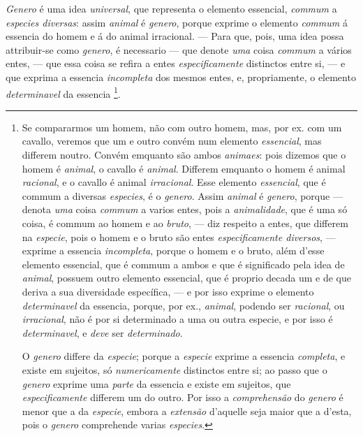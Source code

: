 \emph{Genero} é uma idea \emph{universal}, que representa o elemento essencial, \emph{commum} a \emph{especies diversas}: assim \emph{animal} é \emph{genero}, porque exprime o elemento \emph{commum} á essencia do homem e á do animal irracional. --- Para que, pois, uma idea possa attribuir-se como \emph{genero}, é necessario --- que denote \emph{uma} coisa \emph{commum} a vários entes, --- que essa coisa se refira a entes \emph{especificamente} distinctos entre si, --- e que exprima a essencia \emph{incompleta} dos mesmos entes, e, propriamente, o elemento \emph{determinavel} da essencia \footnote{Se compararmos um homem, não com outro homem, mas, por ex. com um cavallo, veremos que um e outro convém num elemento \emph{essencial}, mas differem noutro. Convém emquanto são ambos \emph{animaes}: pois dizemos que o homem é \emph{animal}, o cavallo é \emph{animal}. Differem emquanto o homem é animal \emph{racional}, e o cavallo é animal \emph{irracional}. Esse elemento \emph{essencial}, que é commum a diversas \emph{especies}, é o \emph{genero}. Assim \emph{animal} é \emph{genero}, porque --- denota \emph{uma} coisa \emph{commum} a varios entes, pois a \emph{animalidade}, que é uma só coisa, é commum ao homem e ao \emph{bruto}, --- diz respeito a entes, que differem na \emph{especie}, pois o homem e o bruto são entes \emph{especificamente diversos}, --- exprime a essencia \emph{incompleta}, porque o homem e o bruto, além d'esse elemento essencial, que é commum a ambos e que é significado pela idea de \emph{animal}, possuem outro elemento essencial, que é proprio decada um e de que deriva a sua diversidade específica, --- e por isso exprime o elemento \emph{determinavel} da essencia, porque, por ex., \emph{animal}, podendo ser \emph{racional}, ou \emph{irracional}, não é por si determinado a uma ou outra especie, e por isso é \emph{determinavel}, e \emph{deve} ser \emph{determinado}.\par O \emph{genero} differe da \emph{especie}; porque a \emph{especie} exprime a essencia \emph{completa}, e existe em sujeitos, só \emph{numericamente} distinctos entre si; ao passo que o \emph{genero} exprime uma \emph{parte} da essencia e existe em sujeitos, que \emph{especificamente} differem um do outro. Por isso a \emph{comprehensão} do \emph{genero} é menor que a da \emph{especie}, embora a \emph{extensão} d'aquelle seja maior que a d'esta, pois o \emph{genero} comprehende varias \emph{especies}.}.


